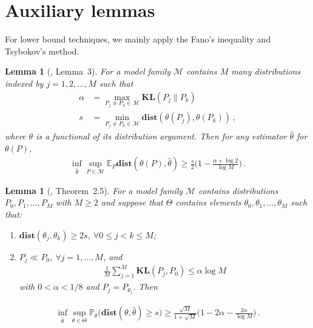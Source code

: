 \documentclass{article}
\newtheorem{lemma}[theorem]{Lemma}
\theoremstyle{definition}
\theoremstyle{definition}
\theoremstyle{definition}
\theoremstyle{definition}
\theoremstyle{definition}
\theoremstyle{definition}
\theoremstyle{remark}
\theoremstyle{remark}
\newcommand{\E}{\mathbb{E}}
\newcommand{\prob}{\mathbb{P}}
\begin{document}
    



    
    
    
    

    



    







\section{Auxiliary lemmas}
For lower bound techniques, we mainly apply the Fano's inequality and Tsybokov's method.
\begin{lemma}[\citet{yu1997assouad}, Lemma~3]\label{lem:fano}
For a model family $\mathcal{M}$ contains $M$ many distributions indexed by $j=1,2,\ldots,M$ such that 
\begin{align*}
\alpha &= \max_{P_j\ne P_k\in\mathcal{M}}\mathbf{KL}(P_j\| P_k) \\ 
s& =\min_{P_j\ne P_k\in\mathcal{M}}\mathbf{dist}(\theta(P_j),\theta(P_k)) \,,   
\end{align*}
where $\theta$ is a functional of its distribution argument. Then for any estimator $\widehat{\theta}$ for $\theta(P)$,
\begin{align*}
    \inf_{\widehat{\theta}}\sup_{P\in\mathcal{M}} \E_P \mathbf{dist}(\theta(P), \widehat{\theta}) \ge \frac{s}{2}\bigg(1 - \frac{\alpha + \log 2 }{\log M}\bigg) \,.   
\end{align*}
\end{lemma}
\begin{lemma}[\citet{tsybakov2008introduction}, Theorem~2.5]\label{lem:tsy}
    For a model family $\mathcal{M}$ contains distributions $P_0,P_1,\ldots,P_M$ with $M\ge 2$ and suppose that $\Theta$ contains elements $\theta_0,\theta_1,\ldots,\theta_M$ such that:
    \begin{enumerate}
        \item $\mathbf{dist}(\theta_j,\theta_k)\ge 2s$, $\forall 0\le j<k\le M$;
        \item $P_j\ll P_0$, $\forall j=1,\ldots,M$, and 
        \begin{align*}
            \frac{1}{M}\sum_{j=1}^M\mathbf{KL}(P_j,P_0) \le \alpha\log M
        \end{align*}
        with $0<\alpha<1/8$ and $P_j=P_{\theta_j}$. Then
    \end{enumerate}
    \begin{align*}
        \inf_{\widehat{\theta}}\sup_{\theta\in\Theta} \prob_\theta \Big(\mathbf{dist}(\theta, \widehat{\theta}) \ge s\Big) \ge \frac{\sqrt{M}}{1+\sqrt{M}}\bigg(1 - 2\alpha - \frac{2\alpha}{\log M}\bigg) \,.
    \end{align*}
\end{lemma}
\end{document}
